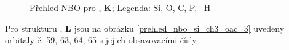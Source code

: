 \documentclass[
digital, %
table,   %
lof,     %
lot,     %
oneside,
]{fithesis3}
\renewcommand{\thesubfigure}{}
\begin{document}
\begin{figure}
\begin{center}
\caption{Přehled NBO pro , \textbf{K};  Legenda:  Si,  O,  C,  P, ~H}
\label{prehled_nbo_SI_AC}
\end{center}
\end{figure}


Pro strukturu , \textbf{L} jsou na obrázku \ref{prehled_nbo_si_ch3_oac_3} uvedeny orbitaly č. 59, 63, 64, 65 s jejich obsazovacími čísly.
\renewcommand{\thesubfigure}{(\alph{subfigure})}
\end{document}
